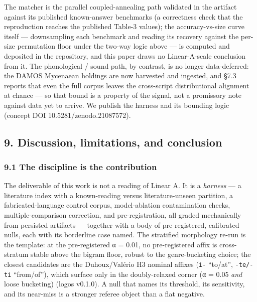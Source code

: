 \documentclass[
  10pt,
]{article}
\begin{document}
The matcher is the parallel coupled-annealing path validated in the
artifact against its published known-answer benchmarks (a correctness
check that the reproduction reaches the published Table-3 values); the
accuracy-vs-size curve itself --- downsampling each benchmark and
reading its recovery against the per-size permutation floor under the
two-way logic above --- is computed and deposited in the repository, and
this paper draws no Linear-A-scale conclusion from it. The phonological
/ sound path, by contrast, is no longer data-deferred: the DĀMOS
Mycenaean holdings are now harvested and ingested, and §7.3 reports that
even the full corpus leaves the cross-script distributional alignment at
chance --- so that bound is a property of the signal, not a promissory
note against data yet to arrive. We publish the harness and its bounding
logic (concept DOI 10.5281/zenodo.21087572).

\hypertarget{discussion-limitations-and-conclusion}{%
\subsection{9. Discussion, limitations, and
conclusion}\label{discussion-limitations-and-conclusion}}

\hypertarget{the-discipline-is-the-contribution}{%
\subsubsection{9.1 The discipline is the
contribution}\label{the-discipline-is-the-contribution}}

The deliverable of this work is not a reading of Linear A. It is a
\emph{harness} --- a literature index with a known-reading versus
literature-unseen partition, a fabricated-language control corpus,
model-ablation contamination checks, multiple-comparison correction, and
pre-registration, all graded mechanically from persisted artifacts ---
together with a body of pre-registered, calibrated nulls, each with its
borderline case named. The stratified morphology re-run is the template:
at the pre-registered α = 0.01, no pre-registered affix is cross-stratum
stable above the bigram floor, robust to the genre-bucketing choice; the
closest candidates are the Duhoux/Valério H3 nominal affixes
(\texttt{i-} ``to/at'', \texttt{-te/-ti} ``from/of''), which surface
only in the doubly-relaxed corner (α = 0.05 \emph{and} loose bucketing)
(logos v0.1.0). A null that names its threshold, its sensitivity, and
its near-miss is a stronger referee object than a flat negative.
\end{document}
